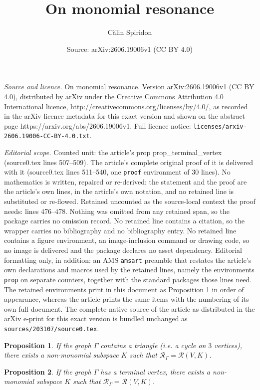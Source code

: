 \documentclass[10pt,a4paper]{amsart}
\title{On monomial resonance}
\author{C\u{a}lin Spiridon}
\date{Source: arXiv:2606.19006v1 (CC BY 4.0)}
\newtheorem{prop}{Proposition}
\newcommand{\cR}{\mathcal{R}}
\begin{document}
\maketitle

\noindent\emph{Source and licence.} On monomial resonance. Version arXiv:2606.19006v1 (CC BY 4.0), distributed by arXiv under the Creative Commons Attribution 4.0 International licence, http://creativecommons.org/licenses/by/4.0/, as recorded in the arXiv licence metadata for this exact version and shown on the abstract page https://arxiv.org/abs/2606.19006v1. Full licence notice: \texttt{licenses/arxiv-2606.19006-CC-BY-4.0.txt}.\par\smallskip

\noindent\textit{Editorial scope.} Counted unit: the article's prop prop\_terminal\_vertex (source0.tex lines 507--509). The article's complete original proof of it is delivered with it (source0.tex lines 511--540, one \texttt{proof} environment of 30 lines). No mathematics is written, repaired or re-derived: the statement and the proof are the article's own lines, in the article's own notation, and no retained line is substituted or re-flowed.  Retained uncounted as the source-local context the proof needs: lines 476--478.  Nothing was omitted from any retained span, so the package carries no omission record.  No retained line contains a citation, so the wrapper carries no bibliography and no bibliography entry.  No retained line contains a figure environment, an image-inclusion command or drawing code, so no image is delivered and the package declares no asset dependency.  Editorial formatting only, in addition: an AMS \texttt{amsart} preamble that restates the article's own declarations and macros used by the retained lines, namely the environments \texttt{prop} on separate counters, together with the standard packages those lines need.  The retained environments print in this document as Proposition 1 in order of appearance, whereas the article prints the same items with the numbering of its own full document.  The complete native source of the article as distributed in the arXiv e-print for this exact version is bundled unchanged as \texttt{sources/203107/source0.tex}.
\begin{prop} \label{prop_triangle}
If the graph $\Gamma$ contains a triangle (i.e. a cycle on $3$ vertices), there exists a non-monomial subspace $K$ such that $\cR_\Gamma = \cR(V,K)$.
\end{prop}

\begin{prop} \label{prop_terminal_vertex}
If the graph $\Gamma$ has a terminal vertex, there exists a non-monomial subspace $K$ such that $\cR_\Gamma = \cR(V,K)$.
\end{prop}
\end{document}
